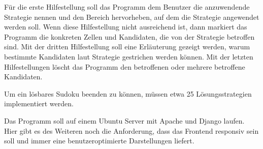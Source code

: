 Für die erste Hilfestellung soll das Programm dem Benutzer die anzuwendende Strategie nennen und den Bereich hervorheben, auf dem die Strategie angewendet werden soll. Wenn diese Hilfestellung nicht ausreichend ist, dann markiert das Programm die konkreten Zellen und Kandidaten, die von der Strategie betroffen sind. Mit der dritten Hilfestellung soll eine Erläuterung gezeigt werden, warum bestimmte Kandidaten laut Strategie gestrichen werden können. Mit der letzten Hilfestellungen löscht das Programm den betroffenen oder mehrere betroffene Kandidaten.

Um ein lösbares Sudoku beenden zu können, müssen etwa 25 Lösungsstrategien implementiert werden.

Das Programm soll auf einem Ubuntu Server mit Apache und Django laufen. Hier gibt es des Weiteren noch die Anforderung, dass das Frontend responsiv sein soll und immer eine benutzeroptimierte Darstellungen liefert.